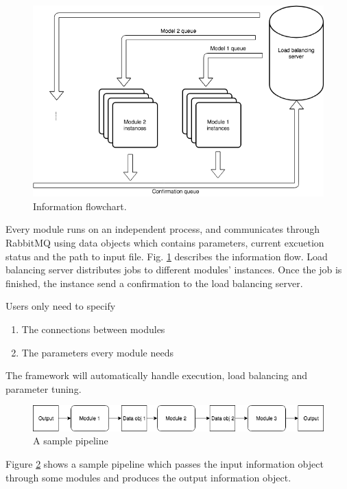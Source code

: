 \documentclass{article}
\begin{document}
    \begin{figure}[h]
        \begin{center}
            \includegraphics[width=\textwidth]{fig/information_flow.png}
        \end{center}
        \label{fig:information_flow}
        \caption{Information flowchart.}
    \end{figure}


    Every module runs on an independent process,
    and communicates through RabbitMQ using data objects which contains parameters, current excuetion status and the path to input file.
    Fig. \ref{fig:information_flow} describes the information flow.
    Load balancing server distributes jobs to different modules' instances.
    Once the job is finished, the instance send a confirmation to the load balancing server.
    

    Users only need to specify
    \begin{enumerate}
        \item The connections between modules
        \item The parameters every module needs
    \end{enumerate}
    The framework will automatically handle execution, load balancing and parameter tuning.

    \begin{figure}[H]
        \begin{center}
            \includegraphics[width=1.2\textwidth]{fig/sample_pipeline.png}
        \end{center}
        \label{fig:sample_pipeline}
        \caption{A sample pipeline}
    \end{figure}
    Figure \ref{fig:sample_pipeline} shows a sample pipeline which passes the input information object
    through some modules and produces the output information object.
\end{document}
